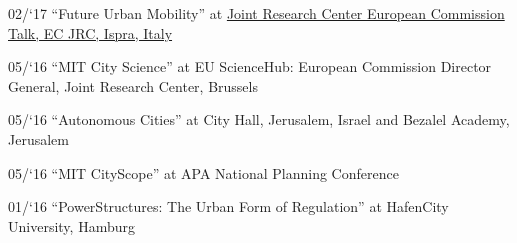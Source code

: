 \begin{tablist}
    \item[02/`17] \tab \enquote{Future Urban Mobility} at \href{https://ec.europa.eu/jrc/en/event/conference/14th-jrc-annual-training-composite-indicators-and-scoreboards} {Joint Research Center European Commission Talk, EC JRC, Ispra, Italy}

    \item[05/`16] \tab \enquote{MIT City Science} at {EU ScienceHub:
        European Commission Director General, Joint Research Center, Brussels}

    \item[05/`16] \tab \enquote{Autonomous Cities} at {City Hall, Jerusalem, Israel and Bezalel Academy, Jerusalem}


    \item[05/`16] \tab \enquote{MIT CityScope} at {APA National Planning Conference}

    \item[01/`16] \tab \enquote{PowerStructures: The Urban Form of Regulation} at {HafenCity University, Hamburg}

\end{tablist}

